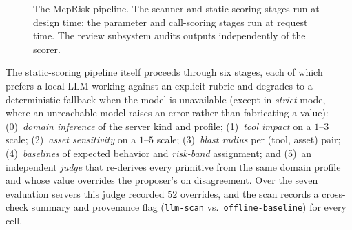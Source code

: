 \begin{figure}[H]
    \centering
    \caption{The McpRisk pipeline. The scanner and static-scoring stages run at
    design time; the parameter and call-scoring stages run at request time. The
    review subsystem audits outputs independently of the scorer.}
    \label{fig:pipeline}
\end{figure}

The static-scoring pipeline itself proceeds through six stages, each of which
prefers a local LLM working against an explicit rubric and degrades to a
deterministic fallback when the model is unavailable (except in \emph{strict}
mode, where an unreachable model raises an error rather than fabricating a
value): (0)~\emph{domain inference} of the server kind and profile;
(1)~\emph{tool impact} on a $1$--$3$ scale; (2)~\emph{asset sensitivity} on a
$1$--$5$ scale; (3)~\emph{blast radius} per (tool, asset) pair;
(4)~\emph{baselines} of expected behavior and \emph{risk-band} assignment; and
(5)~an independent \emph{judge} that re-derives every primitive from the same
domain profile and whose value overrides the proposer's on disagreement. Over
the seven evaluation servers this judge recorded $52$ overrides, and the
scan records a cross-check summary and provenance flag
(\texttt{llm-scan} vs.\ \texttt{offline-baseline}) for every cell.

